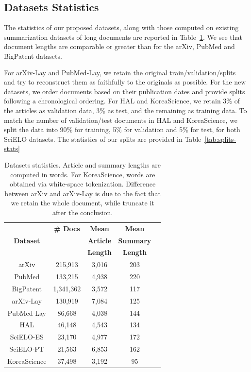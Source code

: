 \subsection{Datasets Statistics}

The statistics of our proposed datasets, along with those computed on existing summarization datasets of long documents \citep{cohan2018discourse, sharma2019bigpatent} are reported in Table~\ref{tab:datasets-stats}. We see that document lengths are comparable or greater than for the arXiv, PubMed and BigPatent datasets.  

For arXiv-Lay and PubMed-Lay, we retain the original train/validation/splits and try to reconstruct them as faithfully to the originals as possible. For the new datasets, we order documents based on their publication dates and provide splits following a chronological ordering. For HAL and KoreaScience, we retain 3\% of the articles as validation data, 3\% as test, and the remaining as training data. To match the number of validation/test documents in HAL and KoreaScience, we split the data into 90\% for training, 5\% for validation and 5\% for test, for both SciELO datasets. The statistics of our splits are provided in Table~\ref{tab:splits-stats}

\begin{table}
\centering
\small
\begin{tabular}{ccccc}
\hline
             \multirow{3}{*}{\textbf{Dataset}} & \textbf{\# Docs} & \textbf{Mean}         & \textbf{Mean}  \\
             &                  & \textbf{Article}        & \textbf{Summary} \\
             &                  & \textbf{Length}        & \textbf{Length} \\
             \hline
arXiv \citep{cohan2018discourse}      & 215,913   & 3,016 & 203  \\
PubMed \citep{cohan2018discourse}     & 133,215   & 4,938 & 220   \\
BigPatent \citep{sharma2019bigpatent} & 1,341,362 & 3,572 & 117 \\
\midrule
arXiv-Lay       & 130,919 & 7,084 & 125 \\
PubMed-Lay      & 86,668  & 4,038 & 144 \\
HAL          & 46,148  & 4,543 & 134 \\
SciELO-ES    & 23,170  & 4,977 & 172 \\
SciELO-PT    & 21,563  & 6,853 & 162 \\
KoreaScience & 37,498  & 3,192 &  95 \\
\hline
\end{tabular}
\caption{Datasets statistics. Article and summary lengths are computed in words. For KoreaScience, words are obtained via white-space tokenization. Difference between arXiv and arXiv-Lay is due to the fact that we retain the whole document, while \citet{cohan2018discourse} truncate it after the conclusion.}
\label{tab:datasets-stats}
\end{table}

